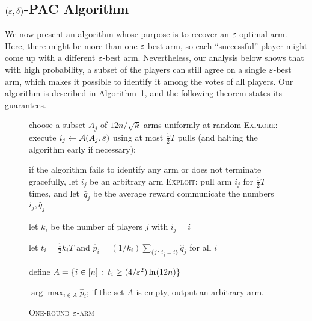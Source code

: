 \documentclass{article} %
\newcommand{\phat}{\hat{p}}
\newcommand{\qhat}{\hat{q}}
\begin{document}
\subsection{$(\varepsilon,\delta)$-PAC Algorithm} \label{sec:oneround_eps}

We now present an algorithm whose purpose is to recover an $\varepsilon$-optimal arm.
Here, there might be more than one $\varepsilon$-best arm, so each ``successful'' player might come up with a different $\varepsilon$-best arm.
Nevertheless, our analysis below shows that with high probability, a subset of the players can still agree on a single $\varepsilon$-best arm, which makes it possible to identify it among the votes of all players.
Our algorithm is described in Algorithm~\ref{alg:oneround_eps}, and the following theorem states its guarantees.



\begin{wrapfigure}[20]{R}{0.5\textwidth}\begin{minipage}{0.5\textwidth}
\vspace{-10pt}

\begin{algorithm}[H] \caption{\textsc{One-round $\varepsilon$-arm}} \label{alg:oneround_eps}
\begin{algorithmic}[1]


	\STATE choose a subset $A_j$ of $12n/\sqrt{k}$ arms uniformly at random
	\STATE \textsc{Explore}: execute $i_j \gets \mathcal{A}(A_j,\varepsilon)$ using at most $\tfrac{1}{2}T$ pulls (and halting the algorithm early if necessary); 
	
	if the algorithm fails to identify any arm or does not terminate gracefully, let $i_j$ be an arbitrary arm
	\STATE \textsc{Exploit}: pull arm $i_j$ for $\tfrac{1}{2}T$ times, and let~$\qhat_j$ be the average reward
	\STATE communicate the numbers $i_j, \qhat_j$
\ENDFOR

\STATE let $k_i$ be the number of players $j$ with $i_j = i$

\STATE let $t_i = \tfrac{1}{2} k_i T$ and 
$\phat_i = (1/k_i) \sum_{\{j \,:\, i_j = i\}} \qhat_j$ for all $i$

\STATE define $A = \{i \in [n] \,:\, t_i \ge (4/\varepsilon^2) \ln (12n)\}$

 $\arg \max_{i \in A} \phat_i$; if the set $A$ is empty, output an arbitrary arm. 
\end{algorithmic}
\end{algorithm}

\end{minipage}\end{wrapfigure}
\end{document}
